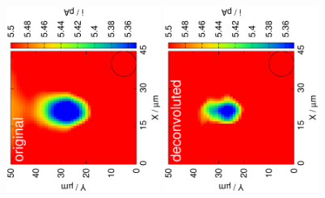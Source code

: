 \documentclass[a4paper, 11pt]{article}
\begin{document}
\thispagestyle{empty}


\thispagestyle{empty}
\begin{figure}
\centering
\includegraphics[width=0.45\textwidth, angle=-90]{140514/6_original.eps}
\includegraphics[width=0.45\textwidth, angle=-90]{140514/6_deconvoluted.eps}
\caption{}
\label{fig:results}
\end{figure}
\end{document}
